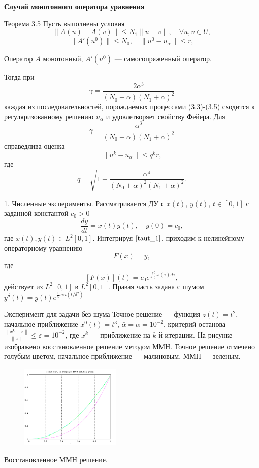 \documentclass[10pt,pdf, mathserif, hyperref={unicode}]{beamer}
\begin{document}
\begin{frame}{\small\textbf{Случай монотонного оператора уравнения}}
	\begin{block}{Теорема 3.5}
		Пусть выполнены условия $$\|A(u)-A(v)\|\le N_1\|u-v\|,  \quad \forall u, v \in U,$$ 
		$$\|A'(u^0)\| \le N_0, \quad \|u^0-u_\alpha\| \le r,$$ 
		
		\smallskip
		Оператор $A$ монотонный, $A'(u^0)$ --- самосопряженный оператор.
		
		\smallskip
		Тогда при $$\gamma=\frac{2\alpha^3}{(N_0+\alpha)(N_1+\alpha)^2}$$ каждая из последовательностей, порождаемых процессами (3.3)-(3.5) сходится к регуляризованному решению $u_\alpha$ и удовлетворяет свойству Фейера.
		Для $$\gamma=\frac{\alpha^3}{(N_0+\alpha)(N_1+\alpha)^2}$$ справедлива оценка
		$$\|u^k-u_\alpha\|\le q^k r,$$ где
		$$q=\sqrt{1-\frac{\alpha^4}{(N_0+\alpha)^2(N_1+\alpha)^2}}.$$
	\end{block}
\end{frame}
\begin{frame}{1. Численные эксперименты.}
	Рассматривается ДУ с $x(t)$, $y(t)$, $t\in[0, 1]$ с заданной константой $c_0>0$
	\begin{equation}\label{taut_1}
	\frac{dy}{dt}=x(t)y(t), \quad y(0)=c_0,
	\end{equation}
	где $x(t), y(t)\in L^2[0,1]$. Интегрируя $\eqref{taut_1}$, приходим к нелинейному операторному уравнению
	\begin{equation}\label{taut_2}
	F(x)=y,
	\end{equation}
	где $$[F(x)](t)=c_0 e^{\int_{0}^{t}x(\tau)d\tau},$$
	действует из $L^2[0,1]$ в $L^2[0,1]$. Правая часть задана с шумом $y^\delta(t)=y(t)e^{\frac{\delta}{5} sin(t/{\delta}^2)}$
\end{frame}
\begin{frame}{Эксперимент для задачи без шума}
	Точное решение --- функция $z(t)=t^2$, начальное приближение $x^0(t)=t^3$, $\bar\alpha=\alpha=10^{-2}$, критерий останова $\frac{\|x^k-z\|}{\|z\|}\le\varepsilon=10^{-2}$, где $x^k$ --- приближение на $k$-й итерации. На рисунке изображено восстановленное решение методом ММН. Точное решение отмечено голубым цветом, начальное приближение --- малиновым, ММН --- зеленым. 
	\begin{figure}[h]
		\centering
		\includegraphics[height=4.0cm]{mmn_ch1}
	\end{figure}
	\centering
	Восстановленное ММН решение.
\end{frame}
\end{document}
